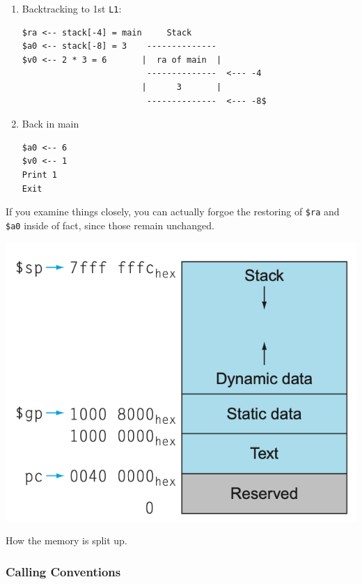\documentclass[10pt]{article}
\begin{document}
\begin{enumerate}
  \item Backtracking to 1st \texttt{L1}: 
\begin{lstlisting}[style=CStyle, xleftmargin=5.0ex, aboveskip=1em, belowskip=1em, escapeinside=..]
$ra <-- stack[-4] = main     Stack
$a0 <-- stack[-8] = 3    --------------
$v0 <-- 2 * 3 = 6       |  ra of main  |
                         --------------  <--- -4
                        |      3       |
                         --------------  <--- -8$
\end{lstlisting}

  \item Back in main
\begin{lstlisting}[style=CStyle, xleftmargin=5.0ex, aboveskip=1em, belowskip=1em, escapeinside=||]
$a0 <-- 6
$v0 <-- 1
Print 1
Exit
\end{lstlisting}
\end{enumerate}
If you examine things closely, you can actually forgoe the restoring of \texttt{\$ra} and \texttt{\$a0} inside of fact, since those remain unchanged.
\begin{marginfigure}
\includegraphics[width=\linewidth]{16.png}
  \caption{How the memory is split up.}
\end{marginfigure}%

\subsubsection{Calling Conventions}
\end{document}
